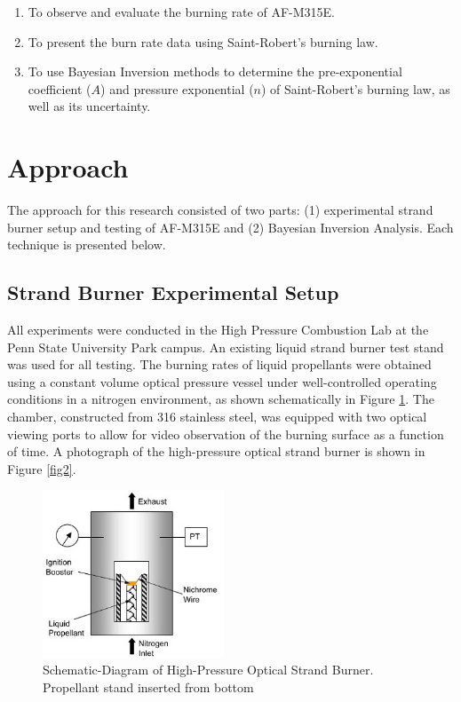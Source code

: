 \documentclass{article}
\begin{document}
\begin{enumerate}
\item To observe and evaluate the burning rate of AF-M315E.
\item To present the burn rate data using Saint-Robert's burning law.
\item To use Bayesian Inversion methods to determine the pre-exponential coefficient ($A$) and pressure exponential
($n$) of Saint-Robert's burning law, as well as its uncertainty.
\end{enumerate}

\section{Approach} \label{approach}

The approach for this research consisted of two parts: (1) experimental strand burner setup and testing of AF-M315E
and (2) Bayesian Inversion Analysis. Each technique is presented below.

\subsection{Strand Burner Experimental Setup} \label{experSetup}

All experiments were conducted in the High Pressure Combustion Lab at the Penn State University Park campus. An 
existing liquid strand burner test stand was used for all testing. The burning rates of liquid propellants were
obtained using a constant volume optical pressure vessel under well-controlled operating conditions in a nitrogen
environment, as shown schematically in Figure \ref{fig1}. The chamber, constructed from 316 stainless steel, was
equipped with two optical viewing ports to allow for video observation of the burning surface as a function of
time. A photograph of the high-pressure optical strand burner is shown in Figure \ref{fig2}.

\begin{figure}[htb]
\centering
\includegraphics[width=0.48\textwidth]{Figure_1.jpg}
\caption{Schematic-Diagram of High-Pressure Optical Strand Burner. Propellant stand inserted from bottom}
\label{fig1}
\end{figure}
\end{document}
